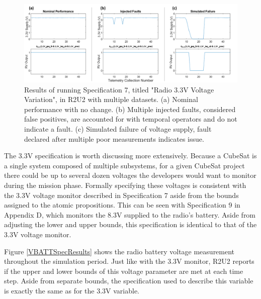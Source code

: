 \documentclass[conf]{new-aiaa}
\begin{document}
\begin{figure}[!ht]
\centering
\includegraphics[width=.8\textwidth]{Fig/3.3V_Spec7.png}
\caption{Results of running Specification 7, titled "Radio 3.3V Voltage Variation", in R2U2 with multiple datasets. (a) Nominal performance with no change. (b) Multiple injected faults, considered false positives, are accounted for with temporal operators and do not indicate a fault. (c) Simulated failure of voltage supply, fault declared after multiple poor measurements indicates issue.}
\label{3V3SpecResults}
\end{figure}

The 3.3V specification is worth discussing more extensively. Because a CubeSat is a single system composed of multiple subsystems, for a given CubeSat project there could be up to several dozen voltages the developers would want to monitor during the mission phase. Formally specifying these voltages is consistent with the 3.3V voltage monitor described in Specification 7 aside from the bounds assigned to the atomic propositions. This can be seen with Specification 9 in Appendix D, which monitors the 8.3V supplied to the radio's battery. Aside from adjusting the lower and upper bounds, this specification is identical to that of the 3.3V voltage monitor.

Figure \ref{VBATTSpecResults} shows the radio battery voltage measurement throughout the simulation period. Just like with the 3.3V monitor, R2U2 reports if the upper and lower bounds of this voltage parameter are met at each time step. Aside from separate bounds, the specification used to describe this variable is exactly the same as for the 3.3V variable.
\end{document}
